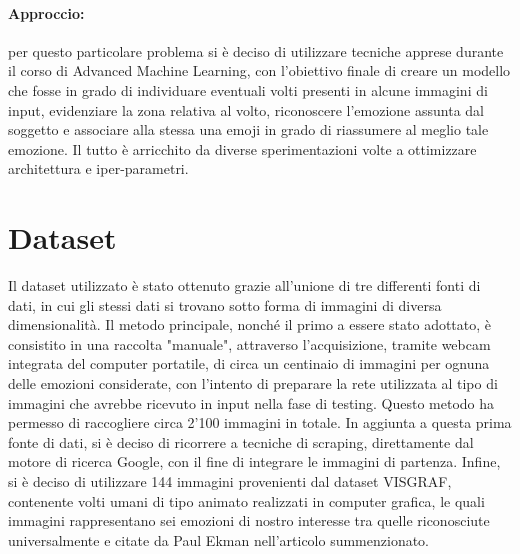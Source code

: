 \paragraph{Approccio:} per questo particolare problema si è deciso di utilizzare tecniche apprese durante il corso di Advanced Machine Learning, con l'obiettivo finale di creare un modello che fosse in grado di individuare eventuali volti presenti in alcune immagini di input, evidenziare la zona relativa al volto, riconoscere l'emozione assunta dal soggetto e associare alla stessa una emoji in grado di riassumere al meglio tale emozione. Il tutto è arricchito da diverse sperimentazioni volte a ottimizzare architettura e iper-parametri.


\section{Dataset}
Il dataset utilizzato è stato ottenuto grazie all'unione di tre differenti fonti di dati, in cui gli stessi dati si trovano sotto forma di immagini di diversa dimensionalità. Il metodo principale, nonché il primo a essere stato adottato, è consistito in una raccolta "manuale", attraverso l'acquisizione, tramite webcam integrata del computer portatile, di circa un centinaio di immagini per ognuna delle emozioni considerate, con l'intento di preparare la rete utilizzata al tipo di immagini che avrebbe ricevuto in input nella fase di testing. Questo metodo ha permesso di raccogliere circa 2'100 immagini in totale. In aggiunta a questa prima fonte di dati, si è deciso di ricorrere a tecniche di scraping, direttamente dal motore di ricerca Google, con il fine di integrare le immagini di partenza. Infine, si è deciso di utilizzare 144 immagini provenienti dal dataset VISGRAF, contenente volti umani di tipo animato realizzati in computer grafica, le quali immagini rappresentano sei emozioni di nostro interesse tra quelle riconosciute universalmente e citate da Paul Ekman nell'articolo summenzionato.

